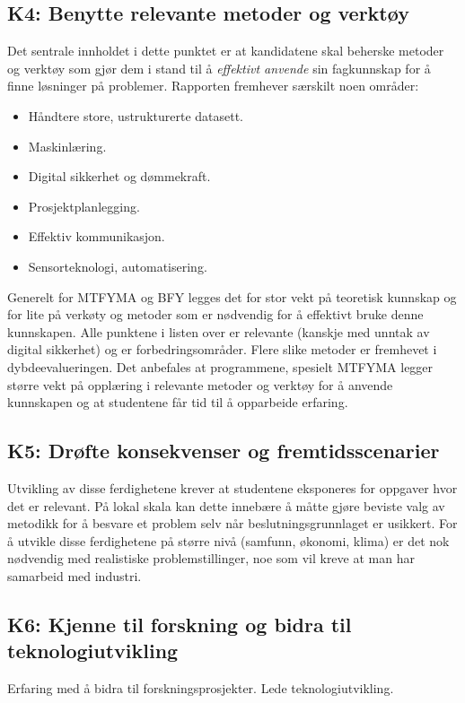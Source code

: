 \subsection{K4: Benytte relevante metoder og verktøy}
Det sentrale innholdet i dette punktet er at kandidatene skal beherske metoder og verktøy som gjør dem i stand til å \emph{effektivt anvende} sin fagkunnskap for å finne løsninger på problemer. Rapporten fremhever særskilt noen områder:

\begin{itemize}
	\item Håndtere store, ustrukturerte datasett.
	\item Maskinlæring.
	\item Digital sikkerhet og dømmekraft.
	\item Prosjektplanlegging.
	\item Effektiv kommunikasjon.
	\item Sensorteknologi, automatisering.
\end{itemize}

Generelt for MTFYMA og BFY legges det for stor vekt på teoretisk kunnskap og for lite på verkøty og metoder som er nødvendig for å effektivt bruke denne kunnskapen. Alle punktene i listen over er relevante (kanskje med unntak av digital sikkerhet) og er forbedringsområder. Flere slike metoder er fremhevet i dybdeevalueringen. Det anbefales at programmene, spesielt MTFYMA legger større vekt på opplæring i relevante metoder og verktøy for å anvende kunnskapen og at studentene får tid til å opparbeide erfaring.

\subsection{K5: Drøfte konsekvenser og fremtidsscenarier}
Utvikling av disse ferdighetene krever at studentene eksponeres for oppgaver hvor det er relevant. På lokal skala kan dette innebære å måtte gjøre beviste valg av metodikk for å besvare et problem selv når beslutningsgrunnlaget er usikkert. For å utvikle disse ferdighetene på større nivå (samfunn, økonomi, klima) er det nok nødvendig med realistiske problemstillinger, noe som vil kreve at man har samarbeid med industri.

\subsection{K6: Kjenne til forskning og bidra til teknologiutvikling}
Erfaring med å bidra til forskningsprosjekter. Lede teknologiutvikling.

